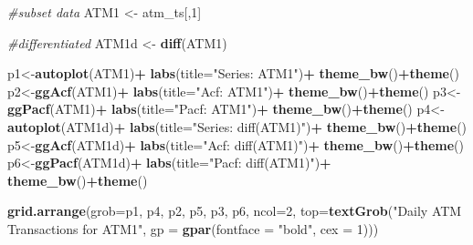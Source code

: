 \documentclass[openany]{book}
\newenvironment{Shaded}{\begin{snugshade}}{\end{snugshade}}
\newcommand{\CommentTok}[1]{\textcolor[rgb]{0.56,0.35,0.01}{\textit{#1}}}
\newcommand{\DataTypeTok}[1]{\textcolor[rgb]{0.13,0.29,0.53}{#1}}
\newcommand{\DecValTok}[1]{\textcolor[rgb]{0.00,0.00,0.81}{#1}}
\newcommand{\KeywordTok}[1]{\textcolor[rgb]{0.13,0.29,0.53}{\textbf{#1}}}
\newcommand{\NormalTok}[1]{#1}
\newcommand{\OperatorTok}[1]{\textcolor[rgb]{0.81,0.36,0.00}{\textbf{#1}}}
\newcommand{\StringTok}[1]{\textcolor[rgb]{0.31,0.60,0.02}{#1}}
\begin{document}
\begin{Shaded}
\begin{Highlighting}[]
\CommentTok{#subset data }
\NormalTok{ATM1 <-}\StringTok{ }\NormalTok{atm_ts[,}\DecValTok{1}\NormalTok{]}

\CommentTok{#differentiated}
\NormalTok{ATM1d <-}\StringTok{  }\KeywordTok{diff}\NormalTok{(ATM1)}

\NormalTok{p1<-}\KeywordTok{autoplot}\NormalTok{(ATM1)}\OperatorTok{+}\StringTok{ }\KeywordTok{labs}\NormalTok{(}\DataTypeTok{title=}\StringTok{"Series: ATM1"}\NormalTok{)}\OperatorTok{+}\StringTok{ }
\StringTok{  }\KeywordTok{theme_bw}\NormalTok{()}\OperatorTok{+}\KeywordTok{theme}\NormalTok{()}
\NormalTok{p2<-}\KeywordTok{ggAcf}\NormalTok{(ATM1)}\OperatorTok{+}\StringTok{ }\KeywordTok{labs}\NormalTok{(}\DataTypeTok{title=}\StringTok{"Acf: ATM1"}\NormalTok{)}\OperatorTok{+}\StringTok{ }
\StringTok{  }\KeywordTok{theme_bw}\NormalTok{()}\OperatorTok{+}\KeywordTok{theme}\NormalTok{()}
\NormalTok{p3<-}\KeywordTok{ggPacf}\NormalTok{(ATM1)}\OperatorTok{+}\StringTok{ }\KeywordTok{labs}\NormalTok{(}\DataTypeTok{title=}\StringTok{"Pacf: ATM1"}\NormalTok{)}\OperatorTok{+}\StringTok{ }
\StringTok{  }\KeywordTok{theme_bw}\NormalTok{()}\OperatorTok{+}\KeywordTok{theme}\NormalTok{()}
\NormalTok{p4<-}\KeywordTok{autoplot}\NormalTok{(ATM1d)}\OperatorTok{+}\StringTok{ }\KeywordTok{labs}\NormalTok{(}\DataTypeTok{title=}\StringTok{"Series: diff(ATM1)"}\NormalTok{)}\OperatorTok{+}\StringTok{ }
\StringTok{  }\KeywordTok{theme_bw}\NormalTok{()}\OperatorTok{+}\KeywordTok{theme}\NormalTok{()}
\NormalTok{p5<-}\KeywordTok{ggAcf}\NormalTok{(ATM1d)}\OperatorTok{+}\StringTok{ }\KeywordTok{labs}\NormalTok{(}\DataTypeTok{title=}\StringTok{"Acf: diff(ATM1)"}\NormalTok{)}\OperatorTok{+}\StringTok{ }
\StringTok{  }\KeywordTok{theme_bw}\NormalTok{()}\OperatorTok{+}\KeywordTok{theme}\NormalTok{()}
\NormalTok{p6<-}\KeywordTok{ggPacf}\NormalTok{(ATM1d)}\OperatorTok{+}\StringTok{ }\KeywordTok{labs}\NormalTok{(}\DataTypeTok{title=}\StringTok{"Pacf: diff(ATM1)"}\NormalTok{)}\OperatorTok{+}\StringTok{ }
\StringTok{  }\KeywordTok{theme_bw}\NormalTok{()}\OperatorTok{+}\KeywordTok{theme}\NormalTok{()}

\KeywordTok{grid.arrange}\NormalTok{(}\DataTypeTok{grob=}\NormalTok{p1, p4, p2, p5, p3, p6,}
             \DataTypeTok{ncol=}\DecValTok{2}\NormalTok{,}
             \DataTypeTok{top=}\KeywordTok{textGrob}\NormalTok{(}\StringTok{"Daily ATM Transactions for ATM1"}\NormalTok{,}
                          \DataTypeTok{gp =} \KeywordTok{gpar}\NormalTok{(}\DataTypeTok{fontface =} \StringTok{"bold"}\NormalTok{, }\DataTypeTok{cex =} \DecValTok{1}\NormalTok{)))}
\end{Highlighting}
\end{Shaded}
\end{document}
